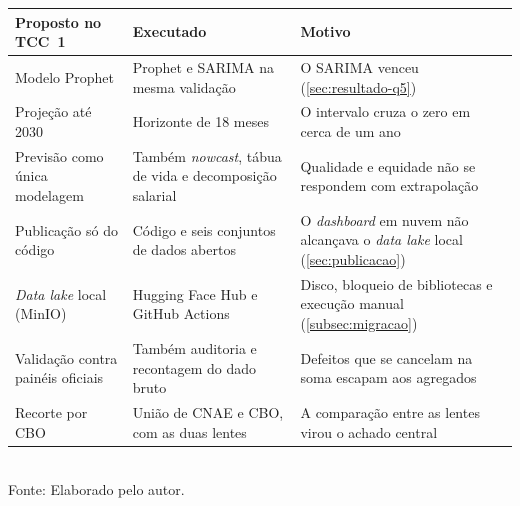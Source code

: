 \begin{quadro}[htbp]
    \centering
    \caption{Revisões em relação à proposta apresentada no TCC~1}
    \label{quadro:revisoes}
    \footnotesize
    \renewcommand{\arraystretch}{1.3}
    \begin{tabularx}{\textwidth}{%
        >{\raggedright\arraybackslash\hsize=0.75\hsize}X
        >{\raggedright\arraybackslash\hsize=0.95\hsize}X
        >{\raggedright\arraybackslash\hsize=1.30\hsize}X}
        \toprule
        \rowcolor{black!8}
        \textbf{Proposto no TCC~1} & \textbf{Executado} & \textbf{Motivo} \\
        \midrule
        Modelo Prophet & Prophet e SARIMA na mesma validação & O SARIMA venceu (\autoref{sec:resultado-q5}) \\ \addlinespace[4pt]
        Projeção até 2030 & Horizonte de 18 meses & O intervalo cruza o zero em cerca de um ano \\ \addlinespace[4pt]
        Previsão como única modelagem & Também \textit{nowcast}, tábua de vida e decomposição salarial & Qualidade e equidade não se respondem com extrapolação \\ \addlinespace[4pt]
        Publicação só do código & Código e seis conjuntos de dados abertos & O \textit{dashboard} em nuvem não alcançava o \textit{data lake} local (\autoref{sec:publicacao}) \\ \addlinespace[4pt]
        \textit{Data lake} local (MinIO) & Hugging Face Hub e GitHub Actions & Disco, bloqueio de bibliotecas e execução manual (\autoref{subsec:migracao}) \\ \addlinespace[4pt]
        Validação contra painéis oficiais & Também auditoria e recontagem do dado bruto & Defeitos que se cancelam na soma escapam aos agregados \\ \addlinespace[4pt]
        Recorte por CBO & União de CNAE e CBO, com as duas lentes & A comparação entre as lentes virou o achado central \\
        \bottomrule
    \end{tabularx}
    \\[4pt]
    {\footnotesize Fonte: Elaborado pelo autor.}
\end{quadro}
